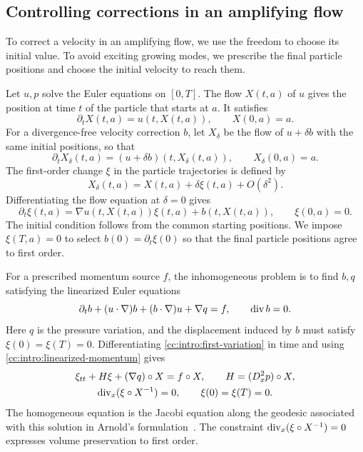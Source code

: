 \subsection{Controlling corrections in an amplifying flow}
To correct a velocity in an amplifying flow, we use the freedom to choose
its initial value. To avoid exciting growing modes, we prescribe the final
particle positions and choose the initial velocity to reach them.

Let $u,p$ solve the Euler equations on $[0,T]$. The flow $X(t,a)$ of
$u$ gives the position at time $t$ of the particle that starts at $a$.
It satisfies
\[
 \partial_tX(t,a)=u(t,X(t,a)),\qquad X(0,a)=a.
\]
For a divergence-free velocity correction $b$, let $X_\delta$ be the
flow of $u+\delta b$ with the same initial positions, so that
\[
 \partial_tX_\delta(t,a)
       =(u+\delta b)(t,X_\delta(t,a)),\qquad X_\delta(0,a)=a.
\]
The first-order change $\xi$ in the particle trajectories is defined by
\[
 X_\delta(t,a)=X(t,a)+\delta\xi(t,a)+O(\delta^2).
\]
Differentiating the flow equation at $\delta=0$ gives
\begin{equation}\label{cc:intro:first-variation}
 \partial_t\xi(t,a)=\nabla u(t,X(t,a))\xi(t,a)+b(t,X(t,a)),
 \qquad \xi(0,a)=0.
\end{equation}
The initial condition follows from the common starting positions.
We impose $\xi(T,a)=0$ to select $b(0)=\partial_t\xi(0)$ so that the final
particle positions agree to first order.

For a prescribed momentum source $f$, the inhomogeneous problem is to
find $b,q$ satisfying the linearized Euler equations
\begin{equation}\label{cc:intro:linearized-momentum}
 \partial_t b+(u\cdot\nabla)b+(b\cdot\nabla)u+\nabla q=f,
 \qquad \operatorname{div} b=0.
\end{equation}
Here $q$ is the pressure variation, and the displacement induced by $b$
must satisfy $\xi(0)=\xi(T)=0$. Differentiating
\eqref{cc:intro:first-variation} in time and using
\eqref{cc:intro:linearized-momentum} gives
\begin{equation}\label{cc:intro:jacobi}
 \begin{gathered}
 \xi_{tt}+H\xi+(\nabla q)\circ X=f\circ X,
 \qquad H=(D_x^2p)\circ X,\\
 \operatorname{div}_x(\xi\circ X^{-1})=0,\qquad \xi(0)=\xi(T)=0.
 \end{gathered}
\end{equation}
The homogeneous equation is the Jacobi equation along the geodesic
associated with this solution in Arnold's formulation~\cite{Arnold1966}.
The constraint $\operatorname{div}_x(\xi\circ X^{-1})=0$ expresses volume
preservation to first order.

